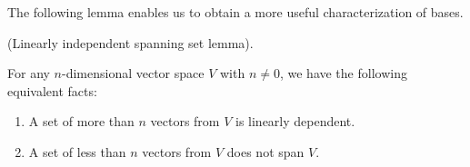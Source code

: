 The following lemma enables us to obtain a more useful characterization of bases.

\begin{lemma}
\label{ch::lin_alg::lemma::dimension}
    (Linearly independent spanning set lemma). 
    
    For any $n$-dimensional vector space $V$ with $n \neq 0$, we have the following equivalent facts:
    
    \begin{enumerate}
        \item A set of more than $n$ vectors from $V$ is linearly dependent.
        \item A set of less than $n$ vectors from $V$ does not span $V$.
    \end{enumerate}
\end{lemma}

